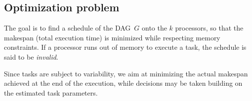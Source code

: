 \documentclass[conference]{IEEEtran}
\newcommand{\cluster}{\,\mathcal{S}}
\begin{document}
\subsection{Optimization problem}
\label{sec.mod.pb}

The goal is to find a schedule of the DAG~$G$ onto the $k$ processors,
so that the makespan (total execution time) is minimized while
respecting memory constraints. If a processor runs out of memory to execute
a task, the schedule is said to be {\em invalid}.

Since tasks are subject to variability, we aim at minimizing the actual makespan
achieved at the end of the execution, while decisions may be taken building
on the estimated task parameters.

%
%
%
%
%
%
%
%
%
%
\end{document}
